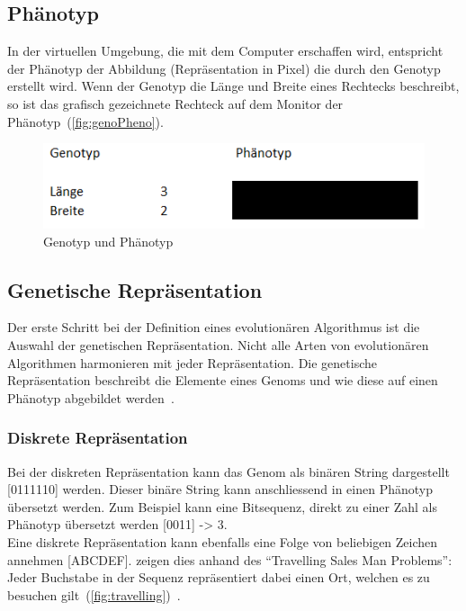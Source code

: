     \subsection{Phänotyp\label{sub:introPhenotyp}}

      In der virtuellen Umgebung, die mit dem Computer erschaffen wird,
      entspricht der Phänotyp der Abbildung (Repräsentation in Pixel) die durch den Genotyp erstellt wird.
      Wenn der Genotyp die Länge und Breite eines Rechtecks beschreibt,
      so ist das grafisch gezeichnete Rechteck auf dem Monitor der Phänotyp~(\vref{fig:genoPheno}).

      \begin{figure}[H]
        \includegraphics[scale=1,center]{graphics/genotyp_phenotyp}
        \caption{Genotyp und Phänotyp\label{fig:genoPheno}}
      \end{figure}

    \subsection{Genetische Repräsentation}

      Der erste Schritt bei der Definition eines evolutionären Algorithmus ist die Auswahl der genetischen Repräsentation.
      Nicht alle Arten von evolutionären Algorithmen harmonieren mit jeder Repräsentation.
      Die genetische Repräsentation beschreibt die Elemente eines Genoms und
      wie diese auf einen Phänotyp abgebildet werden~\cite[S.16]{book:bioInspired}.

      \subsubsection{Diskrete Repräsentation\label{subsub:GeneticRepresentationDiscrete}}

        Bei der diskreten Repräsentation kann das Genom als binären String dargestellt [0111110] werden.
        Dieser binäre String kann anschliessend in einen Phänotyp übersetzt werden.
        Zum Beispiel kann eine Bitsequenz, direkt zu einer Zahl als Phänotyp übersetzt werden [0011] -> 3.
        \\
        Eine diskrete Repräsentation kann ebenfalls eine Folge von beliebigen Zeichen annehmen [ABCDEF].
        \citet{book:bioInspired} zeigen dies anhand des ``Travelling Sales Man Problems'':
        Jeder Buchstabe in der Sequenz repräsentiert dabei einen Ort,
        welchen es zu besuchen gilt~(\vref{fig:travelling})~\cite[S.18]{book:bioInspired}.

